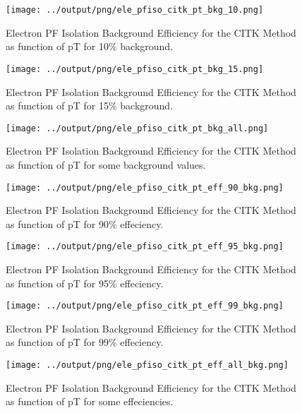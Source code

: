 \documentclass[11pt]{book}
\begin{document}
\begin{figure}[htb]
\centering
\texttt{[image: ../output/png/ele\_pfiso\_citk\_pt\_bkg\_10.png]}
\caption{Electron PF Isolation Background Efficiency for the CITK Method as function of pT for 10\% background.}
\label{fig:ele_pfiso_pt_bkg_citk_bkg_10}
\end{figure}

\begin{figure}[htb]
\centering
\texttt{[image: ../output/png/ele\_pfiso\_citk\_pt\_bkg\_15.png]}
\caption{Electron PF Isolation Background Efficiency for the CITK Method as function of pT for 15\% background.}
\label{fig:ele_pfiso_pt_bkg_citk_bkg_15}
\end{figure}

\begin{figure}[htb]
\centering
\texttt{[image: ../output/png/ele\_pfiso\_citk\_pt\_bkg\_all.png]}
\caption{Electron PF Isolation Background Efficiency for the CITK Method as function of pT for some background values.}
\label{fig:ele_pfiso_pt_bkg_citk_bkg_all}
\end{figure}

\begin{figure}[htb]
\centering
\texttt{[image: ../output/png/ele\_pfiso\_citk\_pt\_eff\_90\_bkg.png]}
\caption{Electron PF Isolation Background Efficiency for the CITK Method as function of pT for 90\% effeciency.}
\label{fig:ele_pfiso_pt_eff_citk_eff_90_bkg}
\end{figure}

\begin{figure}[htb]
\centering
\texttt{[image: ../output/png/ele\_pfiso\_citk\_pt\_eff\_95\_bkg.png]}
\caption{Electron PF Isolation Background Efficiency for the CITK Method as function of pT for 95\% effeciency.}
\label{fig:ele_pfiso_pt_eff_citk_eff_95_bkg}
\end{figure}

\begin{figure}[htb]
\centering
\texttt{[image: ../output/png/ele\_pfiso\_citk\_pt\_eff\_99\_bkg.png]}
\caption{Electron PF Isolation Background Efficiency for the CITK Method as function of pT for 99\% effeciency.}
\label{fig:ele_pfiso_pt_eff_citk_eff_99_bkg}
\end{figure}

\begin{figure}[htb]
\centering
\texttt{[image: ../output/png/ele\_pfiso\_citk\_pt\_eff\_all\_bkg.png]}
\caption{Electron PF Isolation Background Efficiency for the CITK Method as function of pT for some effeciencies.}
\label{fig:ele_pfiso_pt_eff_citk_eff_all_bkg}
\end{figure}
\clearpage
\end{document}
